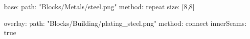 base:
  path: "Blocks/Metals/steel.png"
  method: repeat
  size: [8,8]

overlay:
  path: "Blocks/Building/plating_steel.png"
  method: connect
  innerSeams: true